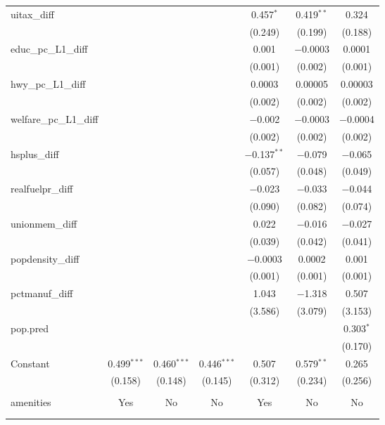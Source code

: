 \begin{table}[!htbp]
\begin{tabular}{@{\extracolsep{5pt}}lcccccc}
  uitax\_diff &  &  &  & 0.457$^{*}$ & 0.419$^{**}$ & 0.324 \\ 
  &  &  &  & (0.249) & (0.199) & (0.188) \\ 
  educ\_pc\_L1\_diff &  &  &  & 0.001 & $-$0.0003 & 0.0001 \\ 
  &  &  &  & (0.001) & (0.002) & (0.001) \\ 
  hwy\_pc\_L1\_diff &  &  &  & 0.0003 & 0.00005 & 0.00003 \\ 
  &  &  &  & (0.002) & (0.002) & (0.002) \\ 
  welfare\_pc\_L1\_diff &  &  &  & $-$0.002 & $-$0.0003 & $-$0.0004 \\ 
  &  &  &  & (0.002) & (0.002) & (0.002) \\ 
  hsplus\_diff &  &  &  & $-$0.137$^{**}$ & $-$0.079 & $-$0.065 \\ 
  &  &  &  & (0.057) & (0.048) & (0.049) \\ 
  realfuelpr\_diff &  &  &  & $-$0.023 & $-$0.033 & $-$0.044 \\ 
  &  &  &  & (0.090) & (0.082) & (0.074) \\ 
  unionmem\_diff &  &  &  & 0.022 & $-$0.016 & $-$0.027 \\ 
  &  &  &  & (0.039) & (0.042) & (0.041) \\ 
  popdensity\_diff &  &  &  & $-$0.0003 & 0.0002 & 0.001 \\ 
  &  &  &  & (0.001) & (0.001) & (0.001) \\ 
  pctmanuf\_diff &  &  &  & 1.043 & $-$1.318 & 0.507 \\ 
  &  &  &  & (3.586) & (3.079) & (3.153) \\ 
  pop.pred &  &  &  &  &  & 0.303$^{*}$ \\ 
  &  &  &  &  &  & (0.170) \\ 
  Constant & 0.499$^{***}$ & 0.460$^{***}$ & 0.446$^{***}$ & 0.507 & 0.579$^{**}$ & 0.265 \\ 
  & (0.158) & (0.148) & (0.145) & (0.312) & (0.234) & (0.256) \\ 
 \hline \\[-1.8ex] 
amenities & Yes & No & No & Yes & No & No \\ 
\hline \\[-1.8ex] 
\hline 
\hline \\[-1.8ex] 
\end{tabular} 
\end{table} 
